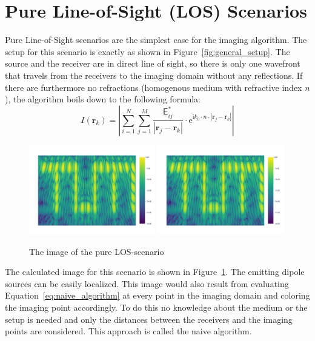 \section{Pure Line-of-Sight (LOS) Scenarios}
Pure Line-of-Sight scenarios are the simplest case for the imaging algorithm.
The setup for this scenario is exactly as shown in Figure~\ref{fig:general_setup}.
The source and the receiver are in direct line of sight, so there is only one wavefront that travels from the receivers to the imaging domain without any reflections.
If there are furthermore no refractions (homogenous medium with refractive index \(n\)), the algorithm boils down to the following formula:
\begin{equation}\label{eq:naive_algorithm}
    I(\bm{r}_k) = |\sum_{i=1}^{N} \sum_{j=1}^{M} \frac{\underline{\mathsf{E}}_{ij}^*}{|\bm{r}_j - \bm{r}_k|} \cdot \mathrm{e}^{\mathrm{i}k_0\cdot n \cdot |\bm{r}_j - \bm{r}_k|}|
\end{equation}

\begin{figure}[ht]
    \centering
    \includegraphics[page=2, width=0.49\textwidth]{figures/pure_los.pdf}
    \includegraphics[page=1, width=0.49\textwidth]{figures/pure_los.pdf}
    \caption{The image of the pure LOS-scenario}\label{fig:los_results}
\end{figure}

The calculated image for this scenario is shown in Figure~\ref{fig:los_results}.
The emitting dipole sources can be easily localized.
This image would also result from evaluating Equation~\eqref{eq:naive_algorithm} at every point in the imaging domain and coloring the imaging point accordingly.
To do this no knowledge about the medium or the setup is needed and only the distances between the receivers and the imaging points are considered.
This approach is called the naive algorithm.


